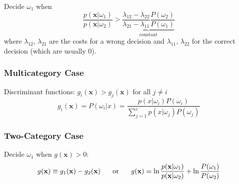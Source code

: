 Decide $\omega_1$ when
$$\frac{p(\mathbf{x}|\omega_1)}{p(\mathbf{x}|\omega_2)} > \underbrace{
\frac{\lambda_{12} - \lambda_{22}}{\lambda_{21} - \lambda_{11}} \frac{P(\omega_2)}{P(\omega_1)}}_{\text{constant}}$$
where $\lambda_{12}$, $\lambda_{21}$ are the costs for a wrong decision and 
$\lambda_{11}$, $\lambda_{22}$ for the correct decision (which are usually $0$).

\subsubsection{Multicategory Case}
Discriminant functions: $g_i(\mathbf{x}) > g_j(\mathbf{x})$ for all $j \neq i$
$$g_i(\mathbf{x}) = P(\omega_i|x) = 
\frac{p(x|\omega_i) P(\omega_i)}{\sum\limits_{j=1}^{c}p(x|\omega_j) P(\omega_j)}$$

\subsubsection{Two-Category Case}
Decide $\omega_1$ when $g(\mathbf{x}) > 0$:
$$g(\mathbf{x}) \equiv g_1(\mathbf{x}) - g_2(\mathbf{x})\hspace{5mm} \text{ or } \hspace{5mm}  
g(\mathbf{x}) = \ln \frac{p(\mathbf{x}|\omega_1)}{p(\mathbf{x}|\omega_2)} + \ln \frac{P(\omega_1)}{P(\omega_2)}$$


